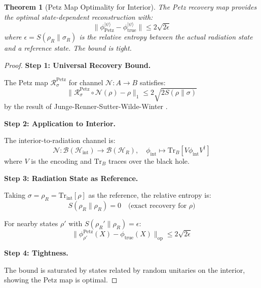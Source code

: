 \documentclass[12pt,a4paper]{article}
\newtheorem{theorem}{Theorem}[section]
\begin{document}
\begin{theorem}[Petz Map Optimality for Interior]\label{thm:petz-optimal}
The Petz recovery map provides the \emph{optimal} state-dependent reconstruction with:
\begin{equation}
\|\phi_{\text{Petz}}^{|\psi\rangle} - \phi_{\text{true}}^{|\psi\rangle}\| \leq 2\sqrt{2\epsilon}
\end{equation}
where $\epsilon = S(\rho_R \| \sigma_R)$ is the relative entropy between the actual radiation state and a reference state. The bound is tight.
\end{theorem}

\begin{proof}
\textbf{Step 1: Universal Recovery Bound.}

The Petz map $\mathcal{R}^{\text{Petz}}_\sigma$ for channel $\mathcal{N}: A \to B$ satisfies:
\begin{equation}
\|\mathcal{R}^{\text{Petz}}_\sigma \circ \mathcal{N}(\rho) - \rho\|_1 \leq 2\sqrt{2S(\rho\|\sigma)}
\end{equation}
by the result of Junge-Renner-Sutter-Wilde-Winter \cite{junge2018}.

\textbf{Step 2: Application to Interior.}

The interior-to-radiation channel is:
\begin{equation}
\mathcal{N}: \mathcal{B}(\mathcal{H}_{\text{int}}) \to \mathcal{B}(\mathcal{H}_R), \quad \phi_{\text{int}} \mapsto \text{Tr}_B[V\phi_{\text{int}} V^\dagger]
\end{equation}
where $V$ is the encoding and $\text{Tr}_B$ traces over the black hole.

\textbf{Step 3: Radiation State as Reference.}

Taking $\sigma = \rho_R = \text{Tr}_{\text{int}}[\rho]$ as the reference, the relative entropy is:
\begin{equation}
S(\rho_R \| \rho_R) = 0 \quad \text{(exact recovery for } \rho \text{)}
\end{equation}

For nearby states $\rho'$ with $S(\rho_R' \| \rho_R) = \epsilon$:
\begin{equation}
\|\phi^{\text{Petz}}_{\rho'}(X) - \phi_{\text{true}}(X)\|_{\text{op}} \leq 2\sqrt{2\epsilon}
\end{equation}

\textbf{Step 4: Tightness.}

The bound is saturated by states related by random unitaries on the interior, showing the Petz map is optimal.
\end{proof}
\end{document}
